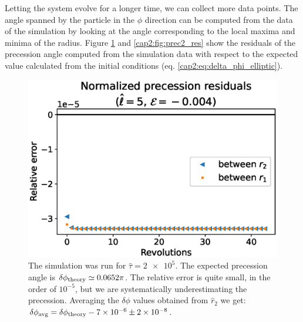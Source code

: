 Letting the system evolve for a longer time, we can collect more data points.
The angle spanned by the particle in the $\phi$ direction can be computed from
the data of the simulation by looking at the angle corresponding to the local
maxima and minima of the radius.
Figure \ref{cap2:fig:prec1_res} and \ref{cap2:fig:prec2_res} show the residuals
of the precession angle computed from the simulation data with respect to the
expected value calculated from the initial conditions
(eq. \ref{cap2:eq:delta_phi_elliptic}).

\begin{figure}[h]
    \begin{minipage}{0.48 \textwidth}
        \centering
        \includegraphics[width=\textwidth]{Figures/chapter2/prec1_res.eps}
        \caption{The simulation was run for $\hat \tau = \num{2e5}$.
        The expected precession angle is $\delta \phi_{\rm theory} \simeq 0.0652
        \pi$.
        The relative error is quite small, in the order of $10^{-5}$, but we are
        systematically underestimating the precession.
        Averaging the $\delta \phi$ values obtained from $\hat r_2$ we get: \\
        $\delta \phi_{\rm avg} = \delta \phi_{\rm theory} - \num{7e-6} \pm \num{2e-8}$.}
        \label{cap2:fig:prec1_res}
    \end{minipage}
    \hspace{0.015 \textwidth}
    \begin{minipage}{0.48 \textwidth}
        \centering

\end{minipage}
\end{figure}
